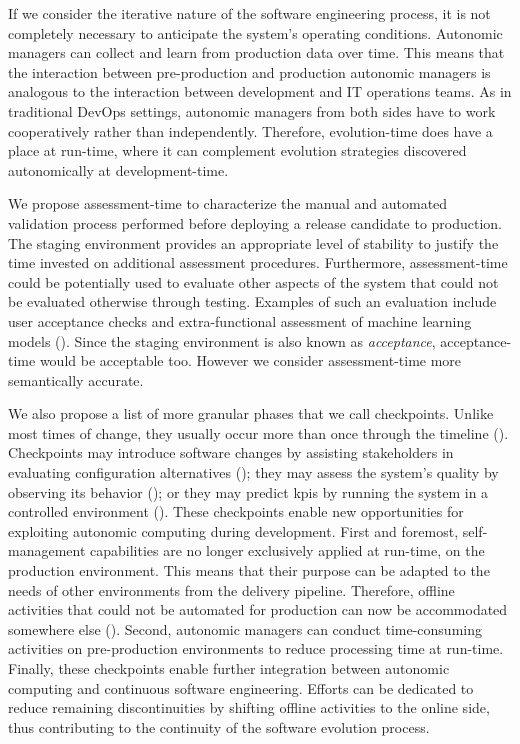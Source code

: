 If we consider the iterative nature of the software engineering process, it is not completely necessary to anticipate the system's operating conditions. Autonomic managers can collect and learn from production data over time. This means that the interaction between pre-production and production autonomic managers is analogous to the interaction between development and IT operations teams. As in traditional DevOps settings, autonomic managers from both sides have to work cooperatively rather than independently. Therefore, evolution-time does have a place at run-time, where it can complement evolution strategies discovered autonomically at development-time.

We propose assessment-time to characterize the manual and automated validation process performed before deploying a release candidate to production. The staging environment provides an appropriate level of stability to justify the time invested on additional assessment procedures. Furthermore, assessment-time could be potentially used to evaluate other aspects of the system that could not be evaluated otherwise through testing. Examples of such an evaluation include  user acceptance checks and extra-functional assessment of machine learning models (). Since the staging environment is also known as \emph{acceptance}, acceptance-time would be acceptable too. However we consider assessment-time more semantically accurate.

We also propose a list of more granular phases that we call checkpoints. Unlike most times of change, they usually occur more than once through the timeline (). Checkpoints may introduce software changes by assisting stakeholders in evaluating configuration alternatives (); they may assess the system's quality by observing its behavior (); or they may predict \glspl{kpi} by running the system in a controlled environment (). These checkpoints enable new opportunities for exploiting autonomic computing during development. First and foremost, self-management capabilities are no longer exclusively applied at run-time, on the production environment. This means that their purpose can be adapted to the needs of other environments from the delivery pipeline. Therefore, offline activities that could not be automated for production can now be accommodated somewhere else (). Second, autonomic managers can conduct time-consuming activities on pre-production environments to reduce processing time at run-time. Finally, these checkpoints enable further integration between autonomic computing and continuous software engineering. Efforts can be dedicated to reduce remaining discontinuities by shifting offline activities to the online side, thus contributing to the continuity of the software evolution process.

